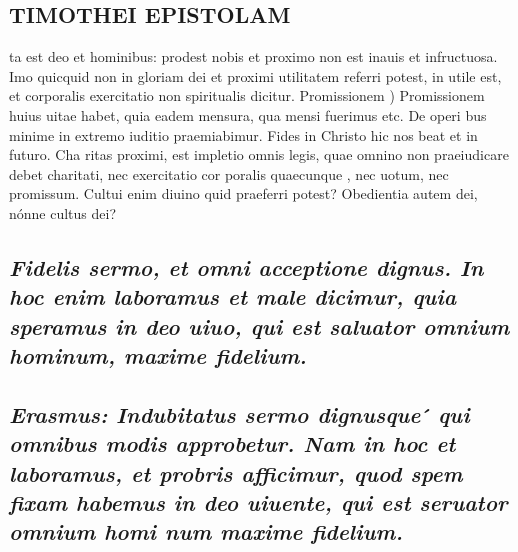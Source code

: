 \documentclass{article}
\begin{document}
\begin{pages}
\section*{TIMOTHEI EPISTOLAM }
\marginpar{[ p.105 ]}\pstart ta est deo et hominibus: prodest nobis et proximo non est inauis et infructuosa. Imo quicquid non in gloriam dei et proximi utilitatem referri potest, in utile est, et corporalis exercitatio non spiritualis dicitur.  \pend\pstart Promissionem ) Promissionem huius uitae habet, quia eadem mensura, qua mensi fuerimus etc. De operi bus minime in extremo iuditio praemiabimur. Fides in Christo hic nos beat et in futuro. Cha ritas proximi, est impletio omnis legis, quae omnino non praeiudicare debet charitati, nec exercitatio cor poralis quaecunque , nec uotum, nec promissum. Cultui enim diuino quid praeferri potest? Obedientia autem dei, nónne cultus dei?  \pend
{}
{}
\subsection*{\textit{Fidelis sermo, et omni acceptione dignus. In hoc enim laboramus et male dicimur, quia speramus in deo uiuo, qui est saluator omnium hominum, maxime fidelium. }}
{}
\subsection*{\textit{Erasmus: Indubitatus sermo dignusque ́ qui omnibus modis approbetur. Nam in hoc et laboramus, et probris afficimur, quod spem fixam habemus in deo uiuente, qui est seruator omnium homi num maxime fidelium. }}

\end{pages}
\end{document}
